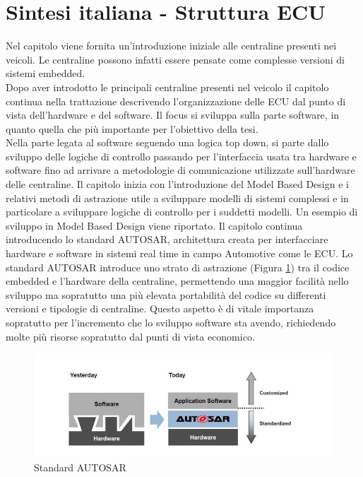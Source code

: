 \documentclass[../main.tex]{subfiles}
\begin{document}
\section{Sintesi italiana - Struttura ECU}
Nel capitolo viene fornita un'introduzione iniziale alle centraline presenti nei veicoli. Le centraline possono infatti essere pensate come complesse versioni di sistemi embedded.\\
Dopo aver introdotto le principali centraline presenti nel veicolo il capitolo continua nella trattazione descrivendo l'organizzazione delle \gls{ECU} dal punto di vista dell'hardware e del software. Il focus si sviluppa sulla parte software, in quanto quella che più importante per l'obiettivo della tesi.\\
Nella parte legata al software seguendo una logica top down, si parte dallo sviluppo delle logiche di controllo passando per l'interfaccia usata tra hardware e software fino ad arrivare a metodologie di comunicazione utilizzate sull'hardware delle centraline. Il capitolo inizia con l'introduzione del Model Based Design  e i relativi metodi di astrazione utile a sviluppare modelli di sistemi complessi e in particolare a sviluppare logiche di controllo per i suddetti modelli. Un esempio di sviluppo in Model Based Design viene riportato. Il capitolo continua introducendo lo standard \gls{AUTOSAR}, architettura creata per interfacciare hardware e software in sistemi real time in campo Automotive come le \gls{ECU}. Lo standard \gls{AUTOSAR} introduce uno strato di astrazione (Figura \ref{fig:autosar}) tra il codice embedded e l'hardware della centraline, permettendo una maggior facilità nello sviluppo ma sopratutto una più elevata portabilità del codice su differenti versioni e tipologie di centraline. Questo aspetto è di vitale importanza sopratutto per l'incremento che lo sviluppo software sta avendo, richiedendo molte più risorse sopratutto dal punti di vista economico.
\begin{figure}[h]
    \centering
    \includegraphics[width=\linewidth]{images_folder/autosarcapture.jpg}
    \caption{Standard AUTOSAR}
    \label{fig:autosar}
\end{figure}
\end{document}
